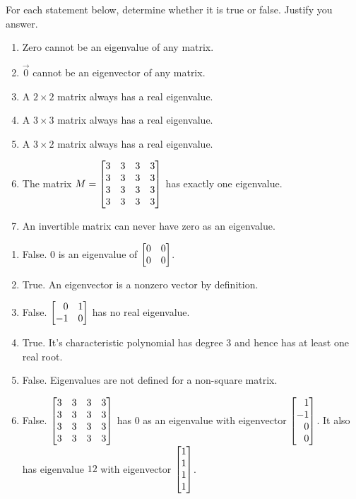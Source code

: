 \begin{exercises}
\begin{problist}
		\prob For each statement below, determine whether it is true or false. Justify
		you answer.
		\begin{enumerate}
			\item Zero cannot be an eigenvalue of any matrix.

			\item $\vec 0$ cannot be an eigenvector of any matrix.

			\item A $2\times 2$ matrix always has a real eigenvalue.

			\item A $3\times 3$ matrix always has a real eigenvalue.

			\item A $3\times 2$ matrix always has a real eigenvalue.

			\item The matrix $M = \mat{3&3&3&3\\3&3&3&3\\3&3&3&3\\3&3&3&3}$ has
				exactly one eigenvalue.

			\item An invertible matrix can never have zero as an eigenvalue.
		\end{enumerate}


		\begin{solution}

			\begin{enumerate}
				\item False. $0$ is an eigenvalue of $\mat{0 & 0 \\ 0 & 0}$.

				\item True. An eigenvector is a nonzero vector by definition.

				\item False. $\mat{0 & 1 \\ -1 & 0}$ has no real eigenvalue.

				\item True. It's characteristic polynomial has degree $3$ and
					hence has at least one real root.

				\item False. Eigenvalues are not defined for a non-square matrix.

				\item False. $\mat{3 & 3 & 3 & 3 \\ 3 & 3 & 3 & 3\\3 & 3 &
					3 & 3\\3 & 3 & 3 & 3}$ has $0$ as an eigenvalue with
					eigenvector $\mat{1 \\ -1 \\ 0 \\ 0}$. It also has
					eigenvalue $12$ with eigenvector
					$\mat{1 \\ 1 \\ 1 \\ 1}$.


\end{enumerate}
\end{solution}
\end{problist}
\end{exercises}
